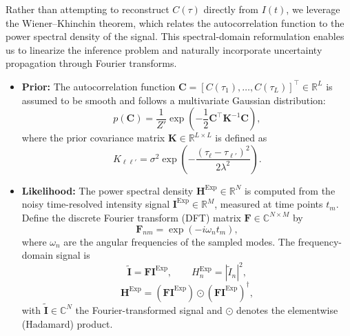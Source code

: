 \documentclass[12pt]{article}
\begin{document}
Rather than attempting to reconstruct \( C(\tau) \) directly from \( I(t) \), we leverage the Wiener--Khinchin theorem, which relates the autocorrelation function to the power spectral density of the signal. This spectral-domain reformulation enables us to linearize the inference problem and naturally incorporate uncertainty propagation through Fourier transforms.

\begin{itemize}
    \item \textbf{Prior:} The autocorrelation function \( \mathbf{C} = [C(\tau_1), \dots, C(\tau_L)]^\top \in \mathbb{R}^L \) is assumed to be smooth and follows a multivariate Gaussian distribution:
    \begin{equation}
        p(\mathbf{C}) = \frac{1}{Z'} \exp\left( -\frac{1}{2} \mathbf{C}^\top \mathbf{K}^{-1} \mathbf{C} \right),
    \end{equation}
    where the prior covariance matrix \( \mathbf{K} \in \mathbb{R}^{L \times L} \) is defined as
    \begin{equation}
        K_{\ell \ell'} = \sigma^2 \exp\left( -\frac{(\tau_\ell - \tau_{\ell'})^2}{2\lambda^2} \right).
    \end{equation}

    \item \textbf{Likelihood:} The power spectral density \( \mathbf{H}^{\mathrm{Exp}} \in \mathbb{R}^N \) is computed from the noisy time-resolved intensity signal \( \mathbf{I}^{\mathrm{Exp}} \in \mathbb{R}^M \), measured at time points \( t_m \). Define the discrete Fourier transform (DFT) matrix \( \mathbf{F} \in \mathbb{C}^{N \times M} \) by
    \begin{equation}
        \mathbf{F}_{n m} = \exp(-i \omega_n t_m),
    \end{equation}
    where \( \omega_n \) are the angular frequencies of the sampled modes. The frequency-domain signal is
    \begin{equation}
        \tilde{\mathbf{I}} = \mathbf{F} \mathbf{I}^{\mathrm{Exp}}, \qquad H_n^{\mathrm{Exp}} = |\tilde{I}_n|^2,
    \end{equation}
    \begin{equation}
        \mathbf{H}^{\mathrm{Exp}} = \left( \mathbf{F} \mathbf{I}^{\mathrm{Exp}} \right) \odot \left( \mathbf{F} \mathbf{I}^{\mathrm{Exp}} \right)^\dagger,
    \end{equation}
    with \( \tilde{\mathbf{I}} \in \mathbb{C}^N \) the Fourier-transformed signal and \(\odot\) denotes the elementwise (Hadamard) product.


\end{itemize}
\end{document}
